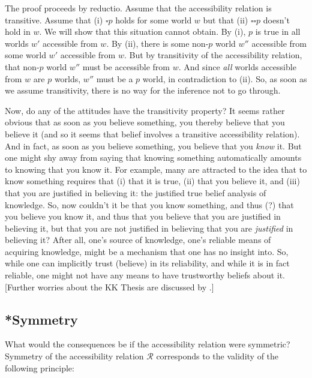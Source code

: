 The proof proceeds by reductio. Assume that the accessibility relation
is transitive. Assume that (i) $\square p$ holds for some world $w$
but that (ii) $\square \square p$ doesn't hold in $w$. We will show
that this situation cannot obtain. By (i), $p$ is true in all worlds
$w'$ accessible from $w$. By (ii), there is some non-$p$ world $w''$
accessible from some world $w'$ accessible from $w$. But by
transitivity of the accessibility relation, that non-$p$ world $w''$
must be accessible from $w$. And since \emph{all} worlds accessible
from $w$ are $p$ worlds, $w''$ must be a $p$ world, in contradiction
to (ii). So, as soon as we assume transitivity, there is no way for
the inference not to go through.

Now, do any of the attitudes have the transitivity property? It seems
rather obvious that as soon as you believe something, you thereby
believe that you believe it (and so it seems that belief involves a
transitive accessibility relation). And in fact, as soon as you
believe something, you believe that you \emph{know} it. But one might
shy away from saying that knowing something automatically amounts to
knowing that you know it. For example, many are attracted to the idea
that to know something requires that (i) that it is true, (ii) that
you believe it, and (iii) that you are justified in believing it: the
justified true belief analysis of knowledge. So, now couldn't it be
that you know something, and thus (?) that you believe you know it,
and thus that you believe that you are justified in believing it, but
that you are not justified in believing that you are \emph{justified}
in believing it? After all, one's source of knowledge, one's reliable
means of acquiring knowledge, might be a mechanism that one has no
insight into. So, while one can implicitly trust (believe) in its
reliability, and while it is in fact reliable, one might not have any
means to have trustworthy beliefs about it. [Further worries about the
KK Thesis are discussed by \citet{williamson:2000:limits}.]

\subsection{*Symmetry}

What would the consequences be if the accessibility relation were
symmetric? Symmetry of the accessibility relation $\mathcal{R}$
corresponds to the validity of the following principle:

